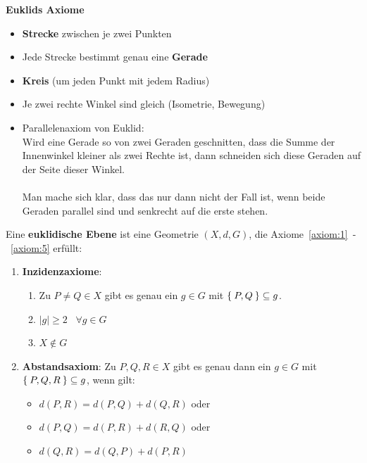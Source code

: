 \textbf{Euklids Axiome}
\begin{itemize}
    \item \textbf{Strecke} zwischen je zwei Punkten
    \item Jede Strecke bestimmt genau eine \textbf{Gerade}
    \item \textbf{Kreis} (um jeden Punkt mit jedem Radius)
    \item Je zwei rechte Winkel sind gleich (Isometrie, Bewegung)
    \item Parallelenaxiom von Euklid:\\
        Wird eine Gerade so von zwei Geraden geschnitten, dass die
        Summe der Innenwinkel kleiner als zwei Rechte ist, dann schneiden sich
        diese Geraden auf der Seite dieser Winkel.\\
        \\
        Man mache sich klar, dass das nur dann nicht der Fall ist,
        wenn beide Geraden parallel sind und senkrecht auf die erste stehen.
\end{itemize}

\begin{definition}%
    Eine \textbf{euklidische Ebene} ist eine Geometrie $(X,d, G)$, die
    Axiome~\ref{axiom:1}~-~\ref{axiom:5} erfüllt:
    \begin{enumerate}[label=§\arabic*),ref=§\arabic*]
        \item \textbf{Inzidenzaxiome}:\label{axiom:1}
            \begin{enumerate}[label=(\roman*),ref=\theenumi{} (\roman*)]
                \item \label{axiom:1.1} Zu $P \neq Q \in X$ gibt es genau ein $g \in G$ mit
                      $\Set{P, Q} \subseteq g$.
                \item \label{axiom:1.2} $|g| \geq 2 \;\;\; \forall g \in G$
                \item \label{axiom:1.3} $X \notin G$
            \end{enumerate}
        \item \textbf{Abstandsaxiom}: Zu $P, Q, R \in X$ gibt es \label{axiom:2}
              genau dann ein $g \in G$ mit $\Set{P, Q, R} \subseteq g$,
              wenn gilt:
              \begin{itemize}[]
                \item $d(P, R) = d(P, Q) + d(Q, R)$ oder
                \item $d(P, Q) = d(P, R) + d(R, Q)$ oder
                \item $d(Q, R) = d(Q, P) + d(P, R)$
              \end{itemize}
    \end{enumerate}
\end{definition}

